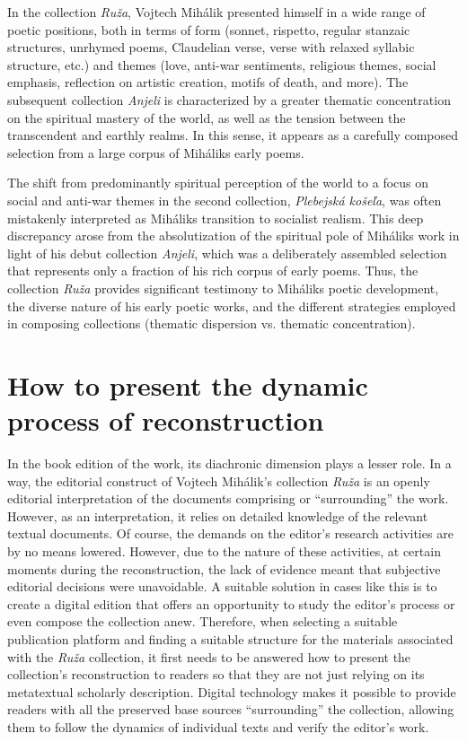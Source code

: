 \begin{paper}
In the collection \emph{Ruža}, Vojtech Mihálik presented himself in a
wide range of poetic positions, both in terms of form (sonnet, rispetto,
regular stanzaic structures, unrhymed poems, Claudelian verse, verse
with relaxed syllabic structure, etc.) and themes (love, anti-war
sentiments, religious themes, social emphasis, reflection on artistic
creation, motifs of death, and more). The subsequent collection
\emph{Anjeli} is characterized by a greater thematic concentration on
the spiritual mastery of the world, as well as the tension between the
transcendent and earthly realms. In this sense, it appears as a
carefully composed selection from a large corpus of
Mihálik\textquotesingle s early poems.

The shift from predominantly spiritual perception of the world to a
focus on social and anti-war themes in the second collection,
\emph{Plebejská košeľa}, was often mistakenly interpreted as
Mihálik\textquotesingle s transition to socialist realism. This deep
discrepancy arose from the absolutization of the spiritual pole of
Mihálik\textquotesingle s work in light of his debut collection
\emph{Anjeli}, which was a deliberately assembled selection that
represents only a fraction of his rich corpus of early poems. Thus, the
collection \emph{Ruža} provides significant testimony to
Mihálik\textquotesingle s poetic development, the diverse nature of his
early poetic works, and the different strategies employed in composing
collections (thematic dispersion vs. thematic concentration).

\section{How to present the dynamic process of
reconstruction}

In the book edition of the work, its diachronic dimension plays a lesser
role. In a way, the editorial construct of Vojtech Mihálik's collection
\emph{Ruža} is an openly editorial interpretation of the documents
comprising or ``surrounding'' the work. However, as an interpretation,
it relies on detailed knowledge of the relevant textual documents. Of
course, the demands on the editor's research activities are by no means
lowered. However, due to the nature of these activities, at certain
moments during the reconstruction, the lack of evidence meant that
subjective editorial decisions were unavoidable. A suitable solution in
cases like this is to create a digital edition that offers an
opportunity to study the editor's process or even compose the collection
anew. Therefore, when selecting a suitable publication platform and
finding a suitable structure for the materials associated with the
\emph{Ruža} collection, it first needs to be answered how to present the
collection's reconstruction to readers so that they are not just relying
on its metatextual scholarly description. Digital technology makes it
possible to provide readers with all the preserved base sources
``surrounding'' the collection, allowing them to follow the dynamics of
individual texts and verify the editor's work.


\end{paper}
